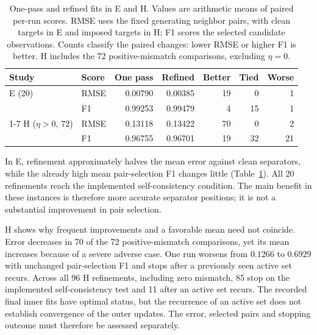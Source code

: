 \begin{table}[!htbp]
\centering
\footnotesize
\setlength{\tabcolsep}{4pt}
\caption{One-pass and refined fits in E and H. Values are arithmetic means of paired per-run scores. RMSE uses the fixed generating neighbor pairs, with clean targets in E and imposed targets in H; F1 scores the selected candidate observations. Counts classify the paired changes: lower RMSE or higher F1 is better. H includes the 72 positive-mismatch comparisons, excluding $\eta=0$.}
\label{tab:refinement-paired}
\begin{tabular}{@{}llrrrrr@{}}
\toprule
Study & Score & One pass & Refined & Better & Tied & Worse \\
\midrule
E (20) & RMSE & 0.00790 & 0.00385 & 19 & 0 & 1 \\
 & F1 & 0.99253 & 0.99479 & 4 & 15 & 1 \\
\cmidrule(lr){1-7}
H ($\eta>0$, 72) & RMSE & 0.13118 & 0.13422 & 70 & 0 & 2 \\
 & F1 & 0.96755 & 0.96701 & 19 & 32 & 21 \\
\bottomrule
\end{tabular}
\end{table}

In E, refinement approximately halves the mean error against clean separators, while the already high mean pair-selection F1 changes little (Table~\ref{tab:refinement-paired}). All 20 refinements reach the implemented self-consistency condition. The main benefit in these instances is therefore more accurate separator positions; it is not a substantial improvement in pair selection.

H shows why frequent improvements and a favorable mean need not coincide. Error decreases in 70 of the 72 positive-mismatch comparisons, yet its mean increases because of a severe adverse case. One run worsens from $0.1266$ to $0.6929$ with unchanged pair-selection F1 and stops after a previously seen active set recurs. Across all 96 H refinements, including zero mismatch, 85 stop on the implemented self-consistency test and 11 after an active set recurs. The recorded final inner fits have optimal status, but the recurrence of an active set does not establish convergence of the outer updates. The error, selected pairs and stopping outcome must therefore be assessed separately.

